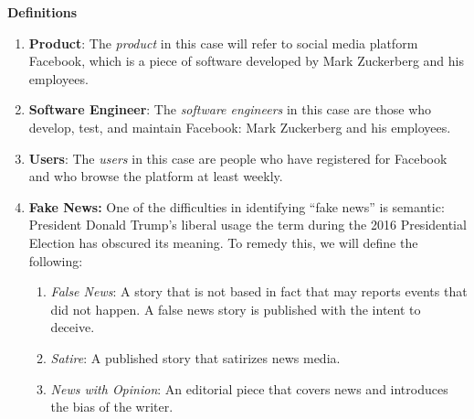 \noindent \textbf{Definitions}

\begin{enumerate}

\item{\textbf{Product}: The \emph{product} in this case will refer to social media platform Facebook, which is a piece of software developed by Mark Zuckerberg and his employees.
}

\item{\textbf{Software Engineer}: The \emph{software engineers} in this case are those who develop, test, and maintain Facebook: Mark Zuckerberg and his employees.
}

\item{\textbf{Users}: The \emph{users} in this case are people who have registered for Facebook and who browse the platform at least weekly.
}

\item{\textbf{Fake News:} One of the difficulties in identifying ``fake news'' is semantic: President Donald Trump's liberal usage the term during the 2016 Presidential Election has obscured its meaning. \cite{npr_fake_news} To remedy this, we will define the following:
\begin{enumerate}
    \item{\emph{False News}: A story that is not based in fact that may reports events that did not happen. A false news story is published with the intent to deceive. \cite{ted_becka}}
    \item{\emph{Satire}: A published story that satirizes news media. \cite{ted_becka}}
    \item{\emph{News with Opinion}: An editorial piece that covers news and introduces the bias of the writer. \cite{ted_becka}}
\end{enumerate}
}

\end{enumerate}
